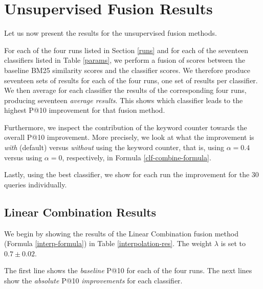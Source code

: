 \section{Unsupervised Fusion Results}
Let us now present the results for the unsupervised fusion methods.

For each of the four runs listed in Section \ref{runs} and for each of the seventeen classifiers listed in Table \ref{params}, we perform a fusion of scores
between the baseline BM25 similarity scores and the classifier scores.
We therefore produce seventeen sets of results for each of the four runs,
one set of results per classifier.
We then average for each classifier the results of the corresponding four runs, producing seventeen \emph{average results}.
This shows which classifier leads to the highest P@10 improvement for that fusion method.

Furthermore, we inspect the contribution of the keyword counter towards the overall P@10 improvement. More precisely,
we look at what the improvement is \emph{with} (default) versus \emph{without} using the keyword counter, that is, using $\alpha=0.4$
versus using $\alpha=0$, respectively, in Formula \ref{clf-combine-formula}.

Lastly, using the best classifier, we show for each run the improvement for the 30 queries individually.

\subsection{Linear Combination Results}
We begin by showing the results of the Linear Combination fusion method (Formula \ref{interp-formula}) in Table \ref{interpolation-res}.
The weight $\lambda$ is set to $0.7\pm 0.02$.

The first line shows the \emph{baseline} P@10 for each of the four runs.
The next lines show the \emph{absolute} P@10 \emph{improvements} for each classifier.

